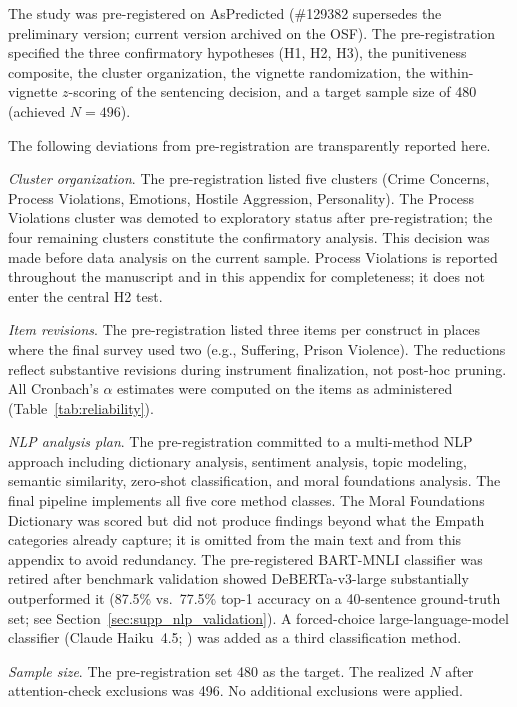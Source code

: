 The study was pre-registered on AsPredicted (\#129382 supersedes the preliminary version; current version archived on the OSF). The pre-registration specified the three confirmatory hypotheses (H1, H2, H3), the punitiveness composite, the cluster organization, the vignette randomization, the within-vignette $z$-scoring of the sentencing decision, and a target sample size of 480 (achieved $N = 496$).

The following deviations from pre-registration are transparently reported here.

\textit{Cluster organization}. The pre-registration listed five clusters (Crime Concerns, Process Violations, Emotions, Hostile Aggression, Personality). The Process Violations cluster was demoted to exploratory status after pre-registration; the four remaining clusters constitute the confirmatory analysis. This decision was made before data analysis on the current sample. Process Violations is reported throughout the manuscript and in this appendix for completeness; it does not enter the central H2 test.

\textit{Item revisions}. The pre-registration listed three items per construct in places where the final survey used two (e.g., Suffering, Prison Violence). The reductions reflect substantive revisions during instrument finalization, not post-hoc pruning. All Cronbach's $\alpha$ estimates were computed on the items as administered (Table~\ref{tab:reliability}).

\textit{NLP analysis plan}. The pre-registration committed to a multi-method NLP approach including dictionary analysis, sentiment analysis, topic modeling, semantic similarity, zero-shot classification, and moral foundations analysis. The final pipeline implements all five core method classes. The Moral Foundations Dictionary was scored but did not produce findings beyond what the Empath \citep{fast2016empath} categories already capture; it is omitted from the main text and from this appendix to avoid redundancy. The pre-registered BART-MNLI classifier was retired after benchmark validation showed DeBERTa-v3-large \citep{he2023deberta} substantially outperformed it (87.5\% vs.\ 77.5\% top-1 accuracy on a 40-sentence ground-truth set; see Section~\ref{sec:supp_nlp_validation}). A forced-choice large-language-model classifier (Claude Haiku~4.5; \citealp{anthropicclaude2024}) was added as a third classification method.

\textit{Sample size}. The pre-registration set 480 as the target. The realized $N$ after attention-check exclusions was 496. No additional exclusions were applied.


